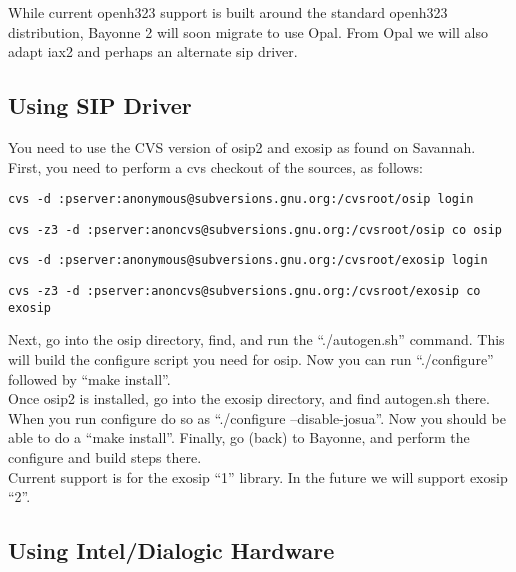\documentclass[a4paper,12pt]{article}
\begin{document}
While current openh323 support is built around the standard openh323
distribution, Bayonne 2 will soon migrate to use Opal.  From Opal we
will also adapt iax2 and perhaps an alternate sip driver. \\

\subsection{Using SIP Driver}

You need to use the CVS version of osip2 and exosip as found on Savannah.
First, you need to perform a cvs checkout of the sources, as follows: \\

\begin{verbatim}
cvs -d :pserver:anonymous@subversions.gnu.org:/cvsroot/osip login
\end{verbatim}

\begin{verbatim}
cvs -z3 -d :pserver:anoncvs@subversions.gnu.org:/cvsroot/osip co osip
\end{verbatim}


\begin{verbatim}
cvs -d :pserver:anonymous@subversions.gnu.org:/cvsroot/exosip login
\end{verbatim}

\begin{verbatim}
cvs -z3 -d :pserver:anoncvs@subversions.gnu.org:/cvsroot/exosip co exosip
\end{verbatim}

Next, go into the osip directory, find, and run the ``./autogen.sh'' command.
This will build the configure script you need for osip.  Now you can
run ``./configure'' followed by ``make install''. \\

Once osip2 is installed, go into the exosip directory, and find
autogen.sh there.  When you run configure do so as ``./configure
--disable-josua''.  Now you should be able to do a ``make install''.
Finally, go (back) to Bayonne, and perform the configure and build
steps there. \\

Current support is for the exosip ``1'' library.  In the future we will
support exosip ``2''. \\

\subsection{Using Intel/Dialogic Hardware}
\end{document}
